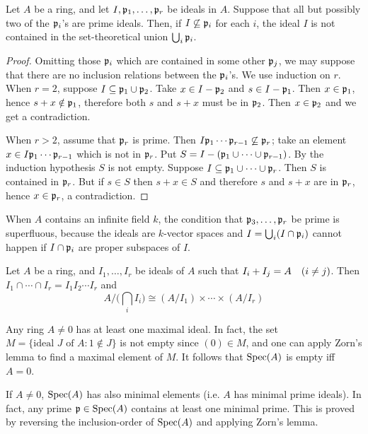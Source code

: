 \documentclass[../main]{subfiles}
\begin{document}
\newparagraph
Let $A$ be a ring, and let $I,\mathfrak{p}_1,\dots,\mathfrak{p}_r$ be ideals in $A$. Suppose that all but possibly two of the $\mathfrak{p}_i$'s are prime ideals. Then, if $I\not\subseteq\mathfrak{p}_i$ for each $i$, the ideal $I$ is not contained in the set-theoretical union $\bigcup_i\mathfrak{p}_i$.

\begin{proof}
Omitting those $\mathfrak{p}_i$ which are contained in some other $\mathfrak{p}_j$, we may suppose that there are no inclusion relations between the $\mathfrak{p}_i$'s. We use induction on $r$. When $r=2$, suppose $I\subseteq\mathfrak{p}_1\cup\mathfrak{p}_2$. Take $x\in I-\mathfrak{p}_2$ and $s\in I-\mathfrak{p}_1$. Then $x\in\mathfrak{p}_1$, hence $s+x\notin\mathfrak{p}_1$, therefore both $s$ and $s+x$ must be in $\mathfrak{p}_2$. Then $x\in\mathfrak{p}_2$ and we get a contradiction.

When $r>2$, assume that $\mathfrak{p}_r$ is prime. Then $I\mathfrak{p}_1\cdots\mathfrak{p}_{r-1}\not\subseteq\mathfrak{p}_r$; take an element $x\in I\mathfrak{p}_1\cdots\mathfrak{p}_{r-1}$ which is not in $\mathfrak{p}_r$. Put $S=I-(\mathfrak{p}_1\cup\cdots\cup\mathfrak{p}_{r-1})$. By the induction hypothesis $S$ is not empty. Suppose $I\subseteq\mathfrak{p}_1\cup\cdots\cup\mathfrak{p}_r$. Then $S$ is contained in $\mathfrak{p}_r$. But if $s\in S$ then $s+x\in S$ and therefore $s$ and $s+x$ are in $\mathfrak{p}_r$, hence $x\in\mathfrak{p}_r$, a contradiction.
\end{proof}

\begin{remark}\label{rem:01.01}
When $A$ contains an infinite field $k$, the condition that $\mathfrak{p}_3,\dots,\mathfrak{p}_r$ be prime is superfluous, because the ideals are $k$-vector spaces and $I=\bigcup_i(I\cap\mathfrak{p}_i)$ cannot happen if $I\cap\mathfrak{p}_i$ are proper subspaces of $I$.
\end{remark}

\newparagraph
Let $A$ be a ring, and $I_1,\ldots,I_r$ be ideals of $A$ such that $I_i+I_j=A\for{i\ne j}$. Then
$I_1\cap\cdots\cap I_r = I_1I_2\cdots I_r$ and
\[A/\bigg(\bigcap_iI_i\bigg) \cong (A/I_1)\times\cdots\times(A/I_r)\]

\newparagraph
Any ring $A\ne0$ has at least one maximal ideal. In fact, the set \newline $M=\{\text{ideal }J\text{ of } A: 1\notin J\}$ is not empty since $(0)\in M$, and one can apply Zorn's lemma to find a maximal element of $M$. It follows that $\operatorname{Spec}(A)$ is empty iff $A=0$.

If $A\ne0$, $\operatorname{Spec}(A)$ has also minimal elements (i.e. $A$ has minimal prime ideals). In fact, any prime $\mathfrak{p}\in\operatorname{Spec}(A)$ contains at least one minimal prime. This is proved by reversing the inclusion-order of $\operatorname{Spec}(A)$ and applying Zorn's lemma.
\end{document}

